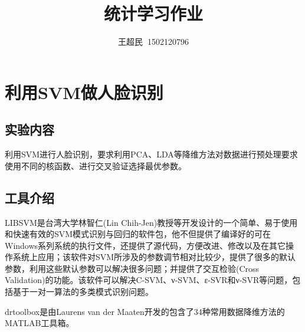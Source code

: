 \documentclass[UTF8]{ctexart}
\author{王超民$\;\;$1502120796}
\title{统计学习作业}
\begin{document}
\maketitle
\section*{利用SVM做人脸识别}
\subsection*{实验内容}
利用SVM进行人脸识别，要求利用PCA、LDA等降维方法对数据进行预处理要求使用不同的核函数、进行交叉验证选择最优参数。
\subsection*{工具介绍}
\par LIBSVM是台湾大学林智仁(Lin Chih-Jen)教授等开发设计的一个简单、易于使用和快速有效的SVM模式识别与回归的软件包，他不但提供了编译好的可在Windows系列系统的执行文件，还提供了源代码，方便改进、修改以及在其它操作系统上应用；该软件对SVM所涉及的参数调节相对比较少，提供了很多的默认参数，利用这些默认参数可以解决很多问题；并提供了交互检验(Cross Validation)的功能。该软件可以解决C-SVM、ν-SVM、ε-SVR和ν-SVR等问题，包括基于一对一算法的多类模式识别问题。
\par drtoolbox是由Laurens van der Maaten开发的包含了34种常用数据降维方法的MATLAB工具箱。
\end{document}
